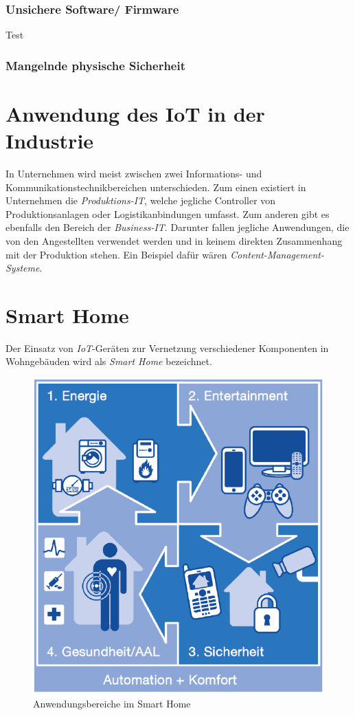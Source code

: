 \documentclass[conference]{IEEEtran}
\begin{document}
\subsubsection{Unsichere Software/ Firmware}
Test\\
\subsubsection{Mangelnde physische Sicherheit}

\section{Anwendung des IoT in der Industrie}

In Unternehmen wird meist zwischen zwei Informations- und Kommunikationstechnikbereichen unterschieden. Zum einen existiert in Unternehmen die \textit{Produktions-IT}, welche jegliche Controller von Produktionsanlagen oder Logistikanbindungen umfasst. Zum anderen gibt es ebenfalls den Bereich der \textit{Business-IT}. Darunter fallen jegliche Anwendungen, die von den Angestellten verwendet werden und in keinem direkten Zusammenhang mit der Produktion stehen. Ein Beispiel dafür wären \textit{Content-Management-Systeme}.\\

\section{Smart Home}
Der Einsatz von \textit{IoT}-Geräten zur Vernetzung verschiedener Komponenten in Wohngebäuden wird als \textit{Smart Home} bezeichnet\cite{andelf}. 

\begin{figure}[h]
\centering
  \includegraphics[width=0.7\columnwidth]{smarthome}
  \caption{Anwendungsbereiche im Smart Home}
  \label{fig:smarthome}
\end{figure}
\end{document}
